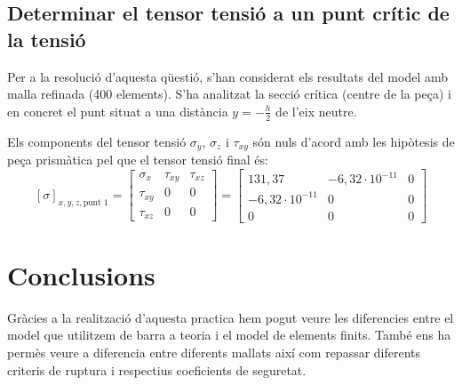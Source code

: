\documentclass[a4paper]{article}
\begin{document}
\subsection{Determinar el tensor tensió a un punt crític de la tensió}

Per a la resolució d'aquesta qüestió, s'han considerat els resultats del model amb malla refinada (400 elements). S'ha analitzat la secció crítica (centre de la peça) i en concret el punt situat a una distància $y=-\frac{h}{2}$ de l'eix neutre.
\begin{figure}[H]
	\centering
\end{figure}

Els components del tensor tensió $\sigma_y$, $\sigma_z$ i $\tau_{xy}$ són nuls d'acord amb les hipòtesis de peça prismàtica pel que el tensor tensió final és:
$$
\left[\sigma\right]_{x,y,z,\text{punt 1}} = 
\begin{bmatrix}
\sigma_x & \tau_{xy} & \tau_{xz} \\
\tau_{xy} & 0 & 0 \\
\tau_{xz} & 0 & 0
\end{bmatrix} = 
\begin{bmatrix}
131,37 & -6,32\cdot 10^{-11} & 0 \\
-6,32\cdot 10^{-11} & 0 & 0 \\
0 & 0 & 0
\end{bmatrix}
$$

\section{Conclusions}
Gràcies a la realització d'aquesta practica hem pogut veure les diferencies entre el model que utilitzem de barra a teoria  i el model de elements finits. També ens ha permès veure a diferencia entre diferents mallats així com repassar diferents criteris de ruptura i respectius coeficients de seguretat.
\end{document}
